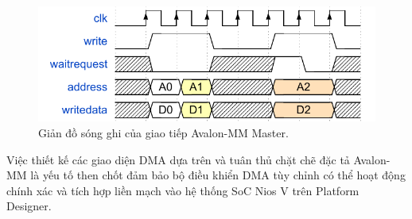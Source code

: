 \begin{enumerate}
    \begin{figure}[htbp]
        \centering
        \includegraphics[width=\linewidth]{Images/02_06_AvalonMaster_WriteWaveform.pdf}
        \caption{Giản đồ sóng ghi của giao tiếp Avalon-MM Master.}
        \label{fig:02_06_avalon_master_write}
    \end{figure}
\end{enumerate}
Việc thiết kế các giao diện DMA dựa trên và tuân thủ chặt chẽ đặc tả Avalon-MM là yếu tố then chốt đảm bảo bộ điều khiển DMA tùy chỉnh có thể hoạt động chính xác và tích hợp liền mạch vào hệ thống SoC Nios V trên Platform Designer.

